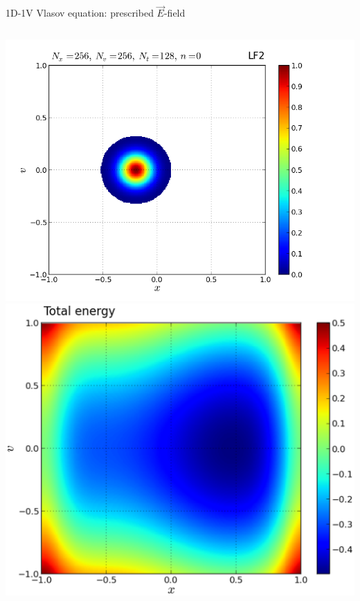\documentclass{beamer}
\begin{document}
\begin{frame}{1D-1V Vlasov equation: prescribed $\vec{E}$-field}
\begin{columns}
\hspace*{-5mm}\includegraphics[scale = 0.30]{graphics/plot_-_1DVP_F12_Nx256Nv256Nt128_it00000}
\hspace*{-5mm}\includegraphics[scale = 0.30]{graphics/W_tot}
\end{columns}

\end{frame}

\end{document}
